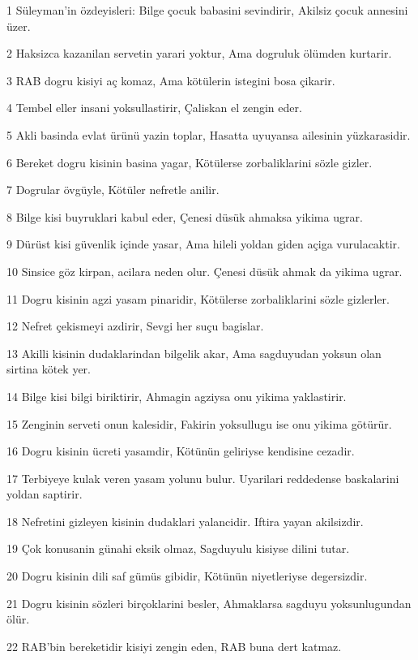 \par 1 Süleyman'in özdeyisleri: Bilge çocuk babasini sevindirir, Akilsiz çocuk annesini üzer.
\par 2 Haksizca kazanilan servetin yarari yoktur, Ama dogruluk ölümden kurtarir.
\par 3 RAB dogru kisiyi aç komaz, Ama kötülerin istegini bosa çikarir.
\par 4 Tembel eller insani yoksullastirir, Çaliskan el zengin eder.
\par 5 Akli basinda evlat ürünü yazin toplar, Hasatta uyuyansa ailesinin yüzkarasidir.
\par 6 Bereket dogru kisinin basina yagar, Kötülerse zorbaliklarini sözle gizler.
\par 7 Dogrular övgüyle, Kötüler nefretle anilir.
\par 8 Bilge kisi buyruklari kabul eder, Çenesi düsük ahmaksa yikima ugrar.
\par 9 Dürüst kisi güvenlik içinde yasar, Ama hileli yoldan giden açiga vurulacaktir.
\par 10 Sinsice göz kirpan, acilara neden olur. Çenesi düsük ahmak da yikima ugrar.
\par 11 Dogru kisinin agzi yasam pinaridir, Kötülerse zorbaliklarini sözle gizlerler.
\par 12 Nefret çekismeyi azdirir, Sevgi her suçu bagislar.
\par 13 Akilli kisinin dudaklarindan bilgelik akar, Ama sagduyudan yoksun olan sirtina kötek yer.
\par 14 Bilge kisi bilgi biriktirir, Ahmagin agziysa onu yikima yaklastirir.
\par 15 Zenginin serveti onun kalesidir, Fakirin yoksullugu ise onu yikima götürür.
\par 16 Dogru kisinin ücreti yasamdir, Kötünün geliriyse kendisine cezadir.
\par 17 Terbiyeye kulak veren yasam yolunu bulur. Uyarilari reddedense baskalarini yoldan saptirir.
\par 18 Nefretini gizleyen kisinin dudaklari yalancidir. Iftira yayan akilsizdir.
\par 19 Çok konusanin günahi eksik olmaz, Sagduyulu kisiyse dilini tutar.
\par 20 Dogru kisinin dili saf gümüs gibidir, Kötünün niyetleriyse degersizdir.
\par 21 Dogru kisinin sözleri birçoklarini besler, Ahmaklarsa sagduyu yoksunlugundan ölür.
\par 22 RAB'bin bereketidir kisiyi zengin eden, RAB buna dert katmaz.
